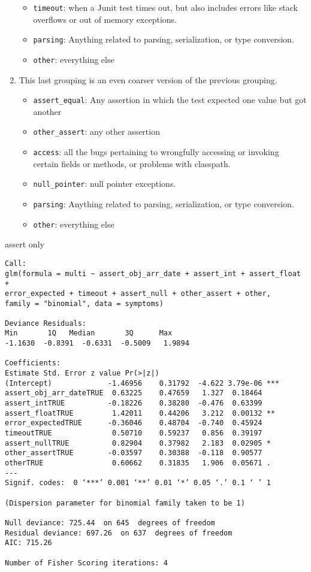 \begin{enumerate}
\begin{itemize}
		\item \lstinline{timeout}: when a Junit test times out, but also includes errors like stack overflows or out of memory exceptions.
		\item \lstinline{parsing}: Anything related to parsing, serialization, or type conversion.
		\item \lstinline{other}: everything else
	\end{itemize}
	\item This last grouping is an even coarser version of the previous grouping.
	\begin{itemize}
		\item \lstinline{assert_equal}: Any assertion in which the test expected one value but got another
		\item \lstinline{other_assert}: any other assertion
		\item \lstinline{access}: all the bugs pertaining to wrongfully accessing or invoking certain fields or methods, or problems with classpath.
		\item \lstinline{null_pointer}: null pointer exceptions.
		\item \lstinline{parsing}: Anything related to parsing, serialization, or type conversion.
		\item \lstinline{other}: everything else
	\end{itemize}
\end{enumerate}


assert only
\begin{lstlisting}[basicstyle=\tiny]
Call:
glm(formula = multi ~ assert_obj_arr_date + assert_int + assert_float + 
error_expected + timeout + assert_null + other_assert + other, 
family = "binomial", data = symptoms)

Deviance Residuals: 
Min       1Q   Median       3Q      Max  
-1.1630  -0.8391  -0.6331  -0.5009   1.9894  

Coefficients:
Estimate Std. Error z value Pr(>|z|)    
(Intercept)             -1.46956    0.31792  -4.622 3.79e-06 ***
assert_obj_arr_dateTRUE  0.63225    0.47659   1.327  0.18464    
assert_intTRUE          -0.18226    0.38280  -0.476  0.63399    
assert_floatTRUE         1.42011    0.44206   3.212  0.00132 ** 
error_expectedTRUE      -0.36046    0.48704  -0.740  0.45924    
timeoutTRUE              0.50710    0.59237   0.856  0.39197    
assert_nullTRUE          0.82904    0.37982   2.183  0.02905 *  
other_assertTRUE        -0.03597    0.30388  -0.118  0.90577    
otherTRUE                0.60662    0.31835   1.906  0.05671 .  
---
Signif. codes:  0 ‘***’ 0.001 ‘**’ 0.01 ‘*’ 0.05 ‘.’ 0.1 ‘ ’ 1

(Dispersion parameter for binomial family taken to be 1)

Null deviance: 725.44  on 645  degrees of freedom
Residual deviance: 697.26  on 637  degrees of freedom
AIC: 715.26

Number of Fisher Scoring iterations: 4
\end{lstlisting}

